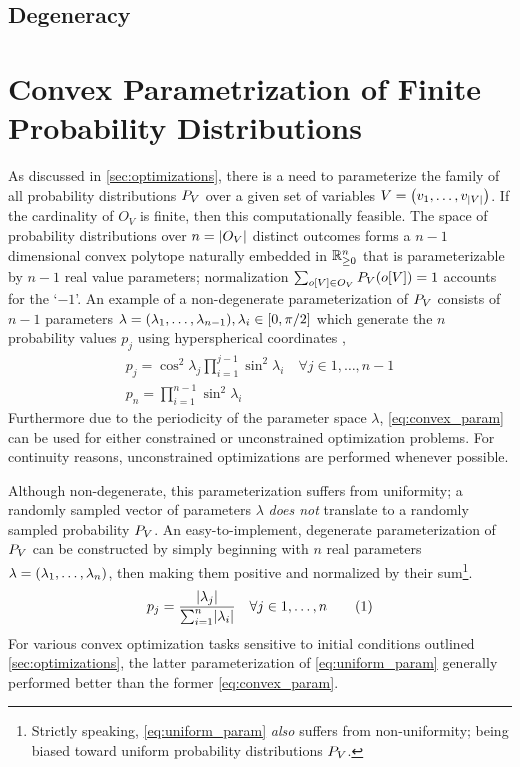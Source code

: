 \documentclass[aps, 10pt, english, twoside, pra, nofootinbib, longbibliography]{revtex4-1}
\theoremstyle{plain}
\theoremstyle{definition}
\theoremstyle{remark}
\newcommand{\outc}[1]{o\bs{#1}} %
\begin{document}
    \subsection{Degeneracy}
    \section{Convex Parametrization of Finite Probability Distributions}
    As discussed in \cref{sec:optimizations}, there is a need to parameterize the family of all probability distributions $\prob[V]$ over a given set of variables $V = \br{v_1, \ldots, v_{\abs{V}}}$. If the cardinality of $O_{V}$ is finite, then this computationally feasible. The space of probability distributions over $n = \abs{O_{V}}$ distinct outcomes forms a $n-1$ dimensional convex polytope naturally embedded in ${\mathbb{R}}_{\geq 0}^n$ \cite{Brunner_2013} that is parameterizable by $n-1$ real value parameters; normalization $\sum_{o\bs{V} \in O_V} \prob[V][\outc{V}] = 1$ accounts for the `$-1$'. An example of a non-degenerate parameterization of $\prob[V]$ consists of $n-1$ parameters $\lambda = \br{\lambda_1, \ldots, \lambda_{n-1}}, \lambda_i \in \bs{0, \pi/2}$ which generate the $n$ probability values $p_j$ using hyperspherical coordinates \cite{Hedemann_2013, Spengler_2010_Unitary},
    \begin{equation}
    \begin{gathered}
        \label{eq:convex_param}
        p_j = \cos^2 \lambda_j \prod_{i=1}^{j-1} \sin^2 \lambda_i \quad \forall j \in 1, \ldots, n - 1 \\
        p_n = \prod_{i=1}^{n-1} \sin^2 \lambda_i
    \end{gathered}
    \end{equation}
    Furthermore due to the periodicity of the parameter space $\lambda$, \cref{eq:convex_param} can be used for either constrained or unconstrained optimization problems. For continuity reasons, unconstrained optimizations are performed whenever possible.

    Although non-degenerate, this parameterization suffers from uniformity; a randomly sampled vector of parameters $\lambda$ \textit{does not} translate to a randomly sampled probability $\prob[V]$. An easy-to-implement, degenerate parameterization of $\prob[V]$ can be constructed by simply beginning with $n$ real parameters $\lambda = \br{\lambda_1, \ldots, \lambda_n}$, then making them positive and normalized by their sum\footnote{Strictly speaking, \cref{eq:uniform_param} \textit{also} suffers from non-uniformity; being biased toward uniform probability distributions $\prob[V]$. }.
    \[ p_j = \f{\abs{\lambda_j}}{\sum_{i=1}^{n} \abs{\lambda_i}} \quad \forall j \in 1, \ldots, n \eq \label{eq:uniform_param} \]
    For various convex optimization tasks sensitive to initial conditions outlined \cref{sec:optimizations}, the latter parameterization of \cref{eq:uniform_param} generally performed better than the former \cref{eq:convex_param}.

    
\end{document}

